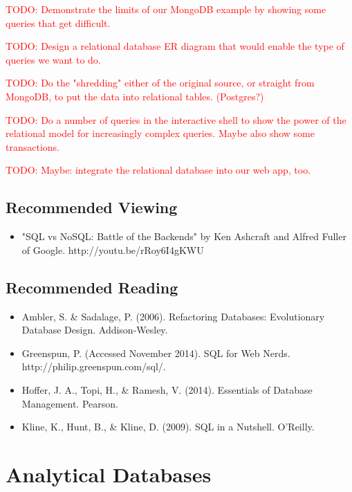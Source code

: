 \documentclass[11pt]{book}
\newcommand{\todo}[1]{\textcolor{red}{TODO: #1}} %
\begin{document}
\todo{Demonstrate the limits of our MongoDB example by showing some queries that get difficult.}

\todo{Design a relational database ER diagram that would enable the type of queries we want to do.}

\todo{Do the "shredding" either of the original source, or straight from MongoDB, to put the data into relational tables. (Postgres?)}

\todo{Do a number of queries in the interactive shell to show the power of the relational model for increasingly complex queries.  Maybe also show some transactions.}

\todo{Maybe: integrate the relational database into our web app, too.}

\section*{Recommended Viewing}
\begin{itemize}
    \item "SQL vs NoSQL: Battle of the Backends" by Ken Ashcraft and Alfred Fuller of Google.  http://youtu.be/rRoy6I4gKWU
\end{itemize}

\section*{Recommended Reading}
\begin{itemize}
    \item Ambler, S. \& Sadalage, P. (2006). Refactoring Databases: Evolutionary Database Design.  Addison-Wesley.
    \item Greenspun, P.  (Accessed November 2014). SQL for Web Nerds.\\ http://philip.greenspun.com/sql/.
    \item Hoffer, J. A., Topi, H., \& Ramesh, V. (2014). Essentials of Database Management.  Pearson.
    \item Kline, K., Hunt, B., \& Kline, D. (2009).  SQL in a Nutshell.  O'Reilly.
\end{itemize}









\chapter{Analytical Databases}\label{ch:atoms}
\end{document}
